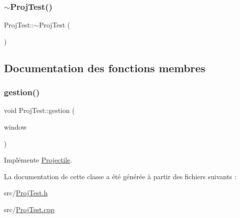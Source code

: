 \mbox{\label{class_proj_test_a9bc10c512035ae9f3294179c5d2db808}} 
\subsubsection{\texorpdfstring{$\sim$\+Proj\+Test()}{~ProjTest()}}
{\footnotesize\ttfamily Proj\+Test\+::$\sim$\+Proj\+Test (\begin{DoxyParamCaption}{ }\end{DoxyParamCaption})}



\subsection{Documentation des fonctions membres}
\mbox{\label{class_proj_test_af0b751a8e8cb0b7d10857722b691f3b6}} 
\subsubsection{\texorpdfstring{gestion()}{gestion()}}
{\footnotesize\ttfamily void Proj\+Test\+::gestion (\begin{DoxyParamCaption}\item[{sf\+::\+Render\+Window \&}]{window }\end{DoxyParamCaption})\hspace{0.3cm}{\ttfamily [virtual]}}



Implémente \hyperlink{class_projectile_aa969857f9837d9be3a6ea415c9ba3ff1}{Projectile}.



La documentation de cette classe a été générée à partir des fichiers suivants \+:\begin{DoxyCompactItemize}
\item 
src/\hyperlink{_proj_test_8h}{Proj\+Test.\+h}\item 
src/\hyperlink{_proj_test_8cpp}{Proj\+Test.\+cpp}\end{DoxyCompactItemize}
